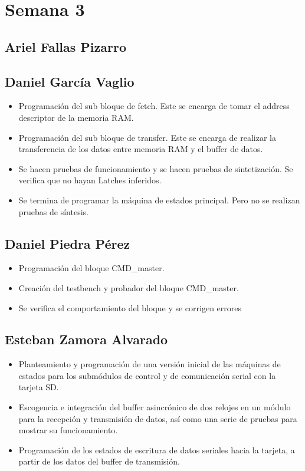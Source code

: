 \section{Semana 3}
\subsection{Ariel Fallas Pizarro}


\subsection{Daniel García Vaglio}
\begin{itemize}
\item Programación del sub bloque de fetch. Este se encarga de tomar el address descriptor de la
  memoria RAM. 
\item Programación del sub bloque de transfer. Este se encarga de realizar la transferencia de los
  datos entre memoria RAM y el buffer de datos. 
\item Se hacen pruebas de funcionamiento y se hacen pruebas de sintetización. Se verifica que no
  hayan Latches inferidos. 
\item Se termina de programar la máquina de estados principal. Pero no se realizan pruebas de
  síntesis.  
\end{itemize}

\subsection{Daniel Piedra Pérez}
\begin{itemize}
\item Programación del bloque CMD\_master.
\item Creación del testbench y probador del bloque CMD\_master.
\item Se verifica el comportamiento del bloque y se corrigen errores
\end{itemize}

\subsection{Esteban Zamora Alvarado}
\begin{itemize}
\item Planteamiento y programación de una versión inicial de las máquinas de estados para los
  submódulos de control y de comunicación serial con la tarjeta SD.
\item Escogencia e integración del buffer asincrónico de dos relojes en un módulo para la recepción
  y transmisión de datos, así como una serie de pruebas para mostrar su funcionamiento.
\item Programación de los estados de escritura de datos seriales hacia la tarjeta, a partir de los datos
  del buffer de transmisión. 
\end{itemize}
\newpage

